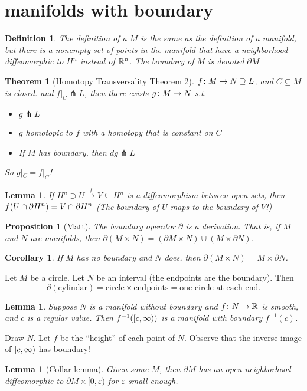 \documentclass[11pt]{amsbook}
\theoremstyle{mystyle} %
\newtheorem{thrm}[thm]{Theorem}
\newtheorem{defi}[thm]{Definition}
\newtheorem{coro}[thm]{Corollary}
\newtheorem{propo}[thm]{Proposition}
\newtheorem{lemm}[thm]{Lemma}
\numberwithin{thm}{section}
\renewcommand{\epsilon}{\varepsilon}
\renewcommand{\d}{\partial}
\newcommand{\transverse}{\pitchfork}
\newcommand{\x}{\times}
\begin{document}
\section{manifolds with boundary}
\begin{defi}
	The definition of a  $M$ is the same as the definition of a manifold, but there is a nonempty set of points in the manifold that have a neighborhood diffeomorphic to $H^n$ instead of ${\mathbb R}^n$.  The boundary of $M$ is denoted $\d M$
\end{defi}

\begin{thrm}[Homotopy Transversality Theorem 2]
	$f\colon M \to N \supseteq L$, and $C \subseteq M$ is closed.
	and $f|_C \transverse L$, then there exists
	$g\colon M \to N$ s.t.
	\begin{itemize}
		\item $g \transverse L$
		\item $g$ homotopic to $f$ with a homotopy that is constant on $C$
		\item If $M$ has boundary, then $dg \transverse L$
	\end{itemize}
	So $g|_C = f|_C$!
\end{thrm}
\begin{lemm}
	If $H^n \supset U \overset{f}{\to} V \subseteq H^n$ is a diffeomorphism between open sets, then $f( U \intersect \d H^n ) = V \intersect \d H^n$
	(The boundary of $U$ maps to the boundary of $V$!)
\end{lemm}
\begin{propo}[Matt]
	The boundary operator $\d$ is a derivation.  That is, if $M$ and $N$ are manifolds, then $\d(M \x N) = (\d M \x N) \cup (M \x \d N)$.
\end{propo}
\begin{coro}
	If $M$ has no boundary and $N$ does, then $\d(M \x N) = M \x \d N$.
\end{coro}
\begin{example}
	Let $M$ be a circle.  Let $N$ be an interval (the endpoints are the boundary).  Then $$\d(\text{cylindar}) = \text{circle} \x \text{endpoints} = \text{one circle at each end}.$$
\end{example}
\begin{lemm}
	Suppose $N$ is a manifold without boundary and $f \colon N \to {\mathbb R}$ is smooth, and $c$ is a regular value.  Then $f^{-1}([c,\infty))$ is a manifold with boundary $f^{-1}(c)$.
\end{lemm}
\begin{example}
	Draw $N$.  Let $f$ be the ``height'' of each point of $N$.  Observe that the inverse image of $[c, \infty)$ has boundary!
\end{example}
\begin{lemm}[Collar lemma]
	Given some $M$, then $\d M$ has an open neighborhood diffeomorphic to $\d M \x [0, \epsilon)$ for $\epsilon$ small enough.
\end{lemm}
\end{document}
